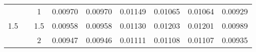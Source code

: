 \documentclass[11pt,a4paper]{article}
\numberwithin{equation}{section}
\begin{document}
\begin{table}[htbp]
\begin{tabular}{c|c|c|ccc|ccc}
			\multirow{3}[1]{*}{1.5} &       & 1     & 0.00970 & 0.00970 & 0.01149 & 0.01065 & 0.01064 & 0.00929 \\

			&       & 1.5   & 0.00958 & 0.00958 & 0.01130 & 0.01203 & 0.01201 & 0.00989 \\

			&       & 2     & 0.00947 & 0.00946 & 0.01111 & 0.01108 & 0.01107 & 0.00935 \\

			\bottomrule

		\end{tabular}%

		\label{tab:est_mortality}%

	\end{table}%

	

	
\end{document}
